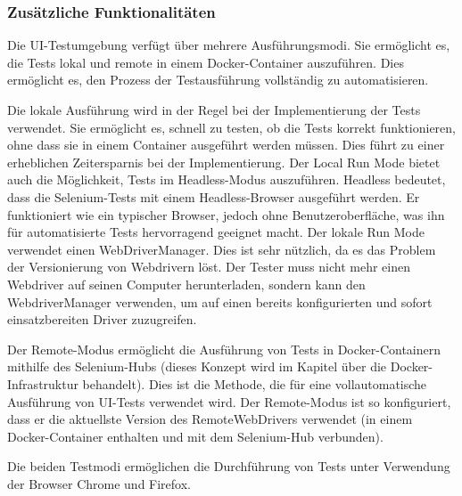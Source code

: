 \subsubsection{Zusätzliche Funktionalitäten}

Die UI-Testumgebung verfügt über mehrere Ausführungsmodi.
Sie ermöglicht es, die Tests lokal und remote in einem Docker-Container
auszuführen. Dies ermöglicht es, den Prozess der Testausführung 
vollständig zu automatisieren.


Die lokale Ausführung wird in der Regel bei der Implementierung
der Tests verwendet. Sie ermöglicht es, schnell zu testen, ob die
Tests korrekt funktionieren, ohne dass sie in einem Container
ausgeführt werden müssen. Dies führt zu einer erheblichen Zeitersparnis
bei der Implementierung. Der Local Run Mode bietet auch die
Möglichkeit, Tests im Headless-Modus auszuführen. Headless bedeutet,
dass die Selenium-Tests mit einem Headless-Browser ausgeführt werden.
Er funktioniert wie ein typischer Browser, jedoch ohne
Benutzeroberfläche, was ihn für automatisierte Tests hervorragend geeignet macht.
Der lokale Run Mode verwendet einen WebDriverManager. Dies ist sehr
nützlich, da es das Problem der Versionierung von Webdrivern löst.
Der Tester muss nicht mehr einen Webdriver auf seinen Computer
herunterladen, sondern kann den WebdriverManager verwenden, um
auf einen bereits konfigurierten und sofort einsatzbereiten Driver
zuzugreifen.

Der Remote-Modus ermöglicht die Ausführung von Tests in
Docker-Containern mithilfe des Selenium-Hubs (dieses Konzept wird
im Kapitel über die Docker-Infrastruktur behandelt). Dies ist die
Methode, die für eine vollautomatische Ausführung von UI-Tests
verwendet wird. Der Remote-Modus ist so konfiguriert, dass er die
aktuellste Version des RemoteWebDrivers verwendet (in einem
Docker-Container enthalten und mit dem Selenium-Hub verbunden).



Die beiden Testmodi ermöglichen die Durchführung von Tests unter
Verwendung der Browser Chrome und Firefox.